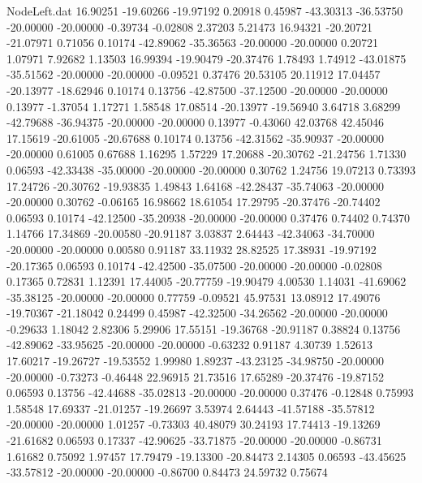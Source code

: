 \begin{filecontents}{NodeLeft.dat}
  16.90251  -19.60266  -19.97192     0.20918    0.45987  -43.30313  -36.53750  -20.00000  -20.00000   -0.39734   -0.02808    2.37203    5.21473
  16.94321  -20.20721  -21.07971     0.71056    0.10174  -42.89062  -35.36563  -20.00000  -20.00000    0.20721    1.07971    7.92682    1.13503
  16.99394  -19.90479  -20.37476     1.78493    1.74912  -43.01875  -35.51562  -20.00000  -20.00000   -0.09521    0.37476   20.53105   20.11912
  17.04457  -20.13977  -18.62946     0.10174    0.13756  -42.87500  -37.12500  -20.00000  -20.00000    0.13977   -1.37054    1.17271    1.58548
  17.08514  -20.13977  -19.56940     3.64718    3.68299  -42.79688  -36.94375  -20.00000  -20.00000    0.13977   -0.43060   42.03768   42.45046
  17.15619  -20.61005  -20.67688     0.10174    0.13756  -42.31562  -35.90937  -20.00000  -20.00000    0.61005    0.67688    1.16295    1.57229
  17.20688  -20.30762  -21.24756     1.71330    0.06593  -42.33438  -35.00000  -20.00000  -20.00000    0.30762    1.24756   19.07213    0.73393
  17.24726  -20.30762  -19.93835     1.49843    1.64168  -42.28437  -35.74063  -20.00000  -20.00000    0.30762   -0.06165   16.98662   18.61054
  17.29795  -20.37476  -20.74402     0.06593    0.10174  -42.12500  -35.20938  -20.00000  -20.00000    0.37476    0.74402    0.74370    1.14766
  17.34869  -20.00580  -20.91187     3.03837    2.64443  -42.34063  -34.70000  -20.00000  -20.00000    0.00580    0.91187   33.11932   28.82525
  17.38931  -19.97192  -20.17365     0.06593    0.10174  -42.42500  -35.07500  -20.00000  -20.00000   -0.02808    0.17365    0.72831    1.12391
  17.44005  -20.77759  -19.90479     4.00530    1.14031  -41.69062  -35.38125  -20.00000  -20.00000    0.77759   -0.09521   45.97531   13.08912
  17.49076  -19.70367  -21.18042     0.24499    0.45987  -42.32500  -34.26562  -20.00000  -20.00000   -0.29633    1.18042    2.82306    5.29906
  17.55151  -19.36768  -20.91187     0.38824    0.13756  -42.89062  -33.95625  -20.00000  -20.00000   -0.63232    0.91187    4.30739    1.52613
  17.60217  -19.26727  -19.53552     1.99980    1.89237  -43.23125  -34.98750  -20.00000  -20.00000   -0.73273   -0.46448   22.96915   21.73516
  17.65289  -20.37476  -19.87152     0.06593    0.13756  -42.44688  -35.02813  -20.00000  -20.00000    0.37476   -0.12848    0.75993    1.58548
  17.69337  -21.01257  -19.26697     3.53974    2.64443  -41.57188  -35.57812  -20.00000  -20.00000    1.01257   -0.73303   40.48079   30.24193
  17.74413  -19.13269  -21.61682     0.06593    0.17337  -42.90625  -33.71875  -20.00000  -20.00000   -0.86731    1.61682    0.75092    1.97457
  17.79479  -19.13300  -20.84473     2.14305    0.06593  -43.45625  -33.57812  -20.00000  -20.00000   -0.86700    0.84473   24.59732    0.75674

\end{filecontents}
